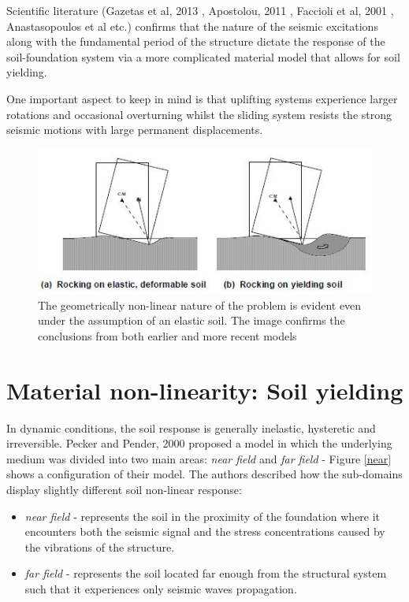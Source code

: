 \documentclass[12pt,a4paper]{report}
\begin{document}
Scientific literature (Gazetas et al, 2013 \cite{gazetas2013nonlinear}, Apostolou, 2011 \cite{apostolou2011soil}, Faccioli et al, 2001 \cite{faccioli2001investigation}, Anastasopoulos et al \cite{anastasopoulos2010soil} etc.) confirms that the nature of the seismic excitations along with the fundamental period of the structure dictate the response of the soil-foundation system via a more complicated material model that allows for soil yielding. 

One important aspect to keep in mind is that uplifting systems experience larger rotations and occasional overturning whilst the sliding system resists the strong seismic motions with large permanent displacements.

\begin{figure}[h!]
	\centering
	\includegraphics[width=0.7\linewidth]{"rocking"}
	\caption{The geometrically non-linear nature of the problem is evident even under the assumption of an elastic soil. The image confirms the conclusions from both earlier and more recent models }
	\label{rocking}
\end{figure}

\section{Material non-linearity: Soil yielding}
In dynamic conditions, the soil response is generally inelastic, hysteretic and irreversible. Pecker and Pender, 2000 \cite{pecker2000earthquake} proposed a model in which the underlying medium was divided into two main areas: \textit{near field} and \textit{far field} - Figure \ref{near} shows a configuration of their model. The authors described how the sub-domains display slightly different soil non-linear response:

\begin{itemize}
	\item \textit{near field} - represents the soil in the proximity of the foundation where it encounters both the seismic signal and the stress concentrations caused by the vibrations of the structure. 
	\item \textit{far field} - represents the soil located far enough from the structural system such that it experiences only seismic waves propagation.
\end{itemize}
 
\end{document}
